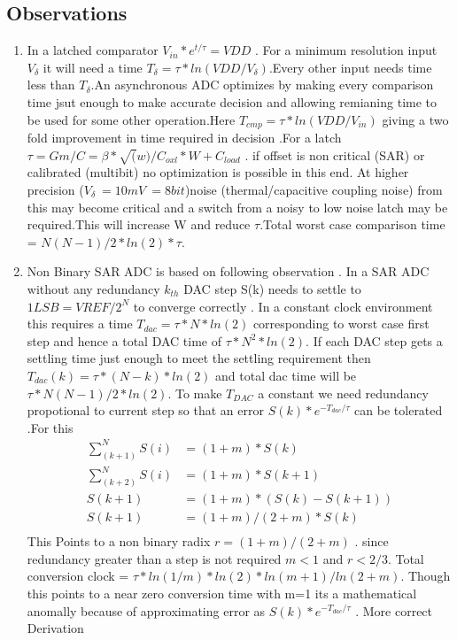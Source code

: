 \documentclass[a4paper,10pt,fleqn,titlepage,twoside]{article}
\begin{document}
\subsection*{Observations}
\begin{enumerate}
\item
{
	In a latched comparator $V_{in}*e^{t/\tau}=VDD$ . For a minimum resolution input $V_{\delta}$ it will need a time $T_{\delta}  = \tau*ln(VDD/V_{\delta})
$.Every other input needs time less than $T_{\delta}$.An asynchronous ADC optimizes by making every comparison time jsut enough to make accurate decision
and allowing remianing time to be used for some other operation.Here $T_{cmp}=\tau*ln(VDD/V_{in})$ giving a two fold improvement in time required in decision
.For a latch $\tau = Gm/C = \beta*\sqrt(w)/C_{oxl}*W +C_{load}$ . if offset is non critical (SAR) or calibrated (multibit) no optimization is possible in this
end. At higher precision ($V_\delta ~= 10mV ~= 8bit$)noise (thermal/capacitive coupling noise) from this may become critical and a switch from a noisy to low noise
latch may be required.This will increase W and reduce $\tau$.Total worst case comparison time = $N(N-1)/2*ln(2)*\tau$.
}
\item
{
	Non Binary SAR ADC is based on following observation . In a SAR ADC without any redundancy $k_{th}$ DAC step S(k) needs to settle to $1LSB = VREF/2^{N}$
to converge correctly . In a constant clock environment this requires a time $T_{dac}=\tau*N*ln(2)$ corresponding to worst case first step and hence a total
DAC time of $\tau*N^{2}*ln(2)$. If each DAC step gets a settling time just enough to meet the settling requirement then $T_{dac}(k)=\tau*(N-k)*ln(2)$ and total dac
time will be $\tau*N(N-1)/2*ln(2)$. To make $T_{DAC}$ a constant we need redundancy propotional to current step so that an error $S(k)*e^{-T_{dac}/\tau}$ can be tolerated
.For this 
\begin{align*}
\sum_{(k+1)}^N{S(i)} &= (1+m)*S(k)\\
\sum_{(k+2)}^N{S(i)} &= (1+m)*S(k+1)\\
S(k+1) &= (1+m)*(S(k)-S(k+1))\\
S(k+1) &= (1+m)/(2+m)*S(k)\\
\end{align*}
This Points to a non binary radix $r=(1+m)/(2+m)$ . since redundancy greater than a step is not required $m<1$ and $r<2/3$. Total conversion clock = $\tau*ln(1/m)*ln(2)*ln(m+1)/ln(2+m)$.
Though this points to a near zero conversion time with m=1 its a mathematical anomally because of approximating error as $S(k)*e^{-T_{dac}/\tau}$ . More correct Derivation
}
\end{enumerate}
\end{document}
